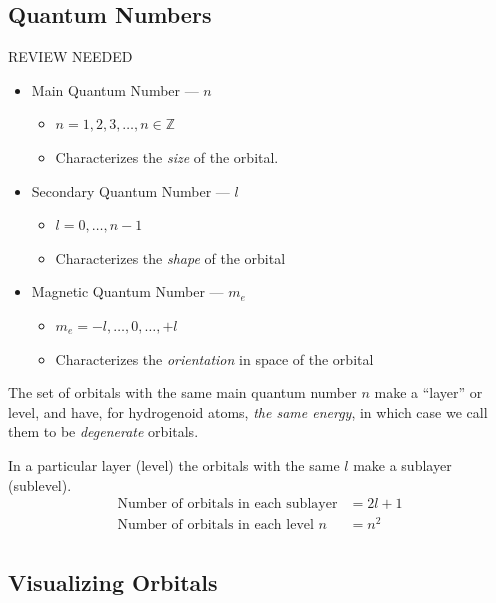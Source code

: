 \documentclass{article}[10pt]
\begin{document}
\subsection{Quantum Numbers}
REVIEW NEEDED
\begin{itemize}
	\item Main Quantum Number --- $n$
	      \begin{itemize}
	      	\item $n=1,2,3,\ldots,n\in\mathbb Z$
	      	\item Characterizes the \emph{size} of the orbital.
	      \end{itemize}
	\item Secondary Quantum Number --- $l$
	      \begin{itemize}
	      	\item $l=0,\ldots,n-1$
	      	\item Characterizes the \emph{shape} of the orbital
	      \end{itemize}
	\item Magnetic Quantum Number --- $m_e$
	      \begin{itemize}
	      	\item $m_e = -l,\ldots,0,\ldots,+l$
	      	\item Characterizes the \emph{orientation} in space of the orbital
	      \end{itemize}
\end{itemize}
The set of orbitals with the same main quantum number $n$ make a ``layer'' or
level, and have, for hydrogenoid atoms, \emph{the same energy}, in which case
we call them to be \emph{degenerate} orbitals.

In a particular layer (level) the orbitals with the same $l$ make a sublayer (sublevel).
\begin{align*}
	\text{Number of orbitals in each sublayer}  & = 2l+1 \\
	\text{Number of orbitals in each level $n$} & = n^2  \\
\end{align*}


\subsection{Visualizing Orbitals}
\end{document}
